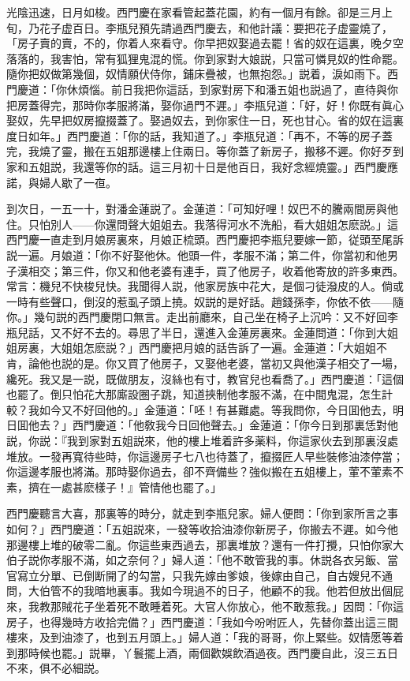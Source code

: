 光陰迅速，日月如梭。西門慶在家看管起蓋花園，約有一個月有餘。卻是三月上旬，乃花子虚百日。李瓶兒預先請過西門慶去，和他計議：要把花子虚靈燒了，「房子賣的賣，不的，你着人來看守。你早把奴娶過去罷！省的奴在這裏，晚夕空落落的，我害怕，常有狐狸鬼混的慌。你到家對大娘説，只當可憐見奴的性命罷。隨你把奴做第幾個，奴情願伏侍你，鋪床疊被，也無抱怨。」説着，淚如雨下。西門慶道：「你休煩惱。前日我把你這話，到家對房下和潘五姐也説過了，直待與你把房蓋得完，那時你孝服將滿，娶你過門不遲。」李瓶兒道：「好，好！你既有眞心娶奴，先早把奴房攛掇蓋了。娶過奴去，到你家住一日，死也甘心。省的奴在這裏度日如年。」西門慶道：「你的話，我知道了。」李瓶兒道：「再不，不等的房子蓋完，我燒了靈，搬在五姐那邊樓上住兩日。等你蓋了新房子，搬移不遲。你好歹到家和五姐説，我還等你的話。這三月初十日是他百日，我好念經燒靈。」西門慶應諾，與婦人歇了一亱。

到次日，一五一十，對潘金蓮説了。金蓮道：「可知好哩！奴巴不的騰兩間房與他住。只怕別人——你還問聲大姐姐去。我落得河水不洗船，看大姐姐怎麽説。」這西門慶一直走到月娘房裏來，月娘正梳頭。西門慶把李瓶兒要嫁一節，従頭至尾訴説一遍。月娘道：「你不好娶他休。他頭一件，孝服不滿；第二件，你當初和他男子漢相交；第三件，你又和他老婆有連手，買了他房子，收着他寄放的許多東西。常言：機兒不快梭兒快。我聞得人説，他家房族中花大，是個刁徒潑皮的人。倘或一時有些聲口，倒沒的惹虱子頭上撓。奴説的是好話。趙錢孫李，你依不依——隨你。」幾句説的西門慶閉口無言。走出前廳來，自己坐在椅子上沉吟：又不好回李瓶兒話，又不好不去的。尋思了半日，還進入金蓮房裏來。金蓮問道：「你到大姐姐房裏，大姐姐怎麽説？」西門慶把月娘的話告訴了一遍。金蓮道：「大姐姐不肯，論他也説的是。你又買了他房子，又娶他老婆，當初又與他漢子相交了一場，纔死。我又是一説，既做朋友，沒絲也有寸，教官兒也看喬了。」西門慶道：「這個也罷了。倒只怕花大那廝設圈子跳，知道挾制他孝服不滿，在中間鬼混，怎生計較？我如今又不好回他的。」金蓮道：「呸！有甚難處。等我問你，今日囬他去，明日囬他去？」西門慶道：「他敎我今日回他聲去。」金蓮道：「你今日到那裏恁對他説，你説：『我到家對五姐説來，他的樓上堆着許多薬料，你這家伙去到那裏沒處堆放。一發再寬待些時，你這邊房子七八也待蓋了，攛掇匠人早些裝修油漆停當；你這邊孝服也將滿。那時娶你過去，卻不齊備些？強似搬在五姐樓上，葷不葷素不素，擠在一處甚麽樣子！』管情他也罷了。」

西門慶聽言大喜，那裏等的時分，就走到李瓶兒家。婦人便問：「你到家所言之事如何？」西門慶道：「五姐説來，一發等收拾油漆你新房子，你搬去不遲。如今他那邊樓上堆的破零二亂。你這些東西過去，那裏堆放？還有一件打攪，只怕你家大伯子説你孝服不滿，如之奈何？」婦人道：「他不敢管我的事。休説各衣另飯、當官寫立分單、已倒断開了的勾當，只我先嫁由爹娘，後嫁由自己，自古嫂兒不通問，大伯管不的我暗地裏事。我如今現過不的日子，他顧不的我。他若但放出個屁來，我教那賊花子坐着死不敢睡着死。大官人你放心，他不敢惹我。」因問：「你這房子，也得幾時方收拾完備？」西門慶道：「我如今吩咐匠人，先替你蓋出這三間樓來，及到油漆了，也到五月頭上。」婦人道：「我的哥哥，你上緊些。奴情愿等着到那時候也罷。」説畢，丫鬟擺上酒，兩個歡娛飲酒過夜。西門慶自此，沒三五日不來，俱不必細説。

